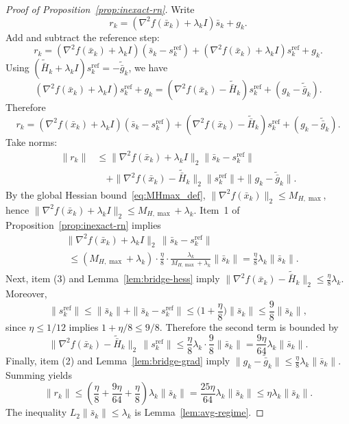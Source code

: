 \documentclass[review,onefignum,onetabnum]{siamart171218}
\begin{document}
	\begin{proof}[Proof of Proposition~\ref{prop:inexact-rn}]
		Write
		\[
		r_k=(\nabla^2 f(\bar x_k)+\lambda_k I)\bar s_k+g_k.
		\]
		Add and subtract the reference step:
		\[
		r_k=(\nabla^2 f(\bar x_k)+\lambda_k I)(\bar s_k-s_k^{\mathrm{ref}})
		+(\nabla^2 f(\bar x_k)+\lambda_k I)s_k^{\mathrm{ref}}+g_k.
		\]
		Using $(\tilde{\bar H}_k+\lambda_k I)s_k^{\mathrm{ref}}=-\tilde{\bar g}_k$, we have
		\[
		(\nabla^2 f(\bar x_k)+\lambda_k I)s_k^{\mathrm{ref}}+g_k
		=(\nabla^2 f(\bar x_k)-\tilde{\bar H}_k)s_k^{\mathrm{ref}}+(g_k-\tilde{\bar g}_k).
		\]
		Therefore
		\[
		r_k=(\nabla^2 f(\bar x_k)+\lambda_k I)(\bar s_k-s_k^{\mathrm{ref}})
		+(\nabla^2 f(\bar x_k)-\tilde{\bar H}_k)s_k^{\mathrm{ref}}+(g_k-\tilde{\bar g}_k).
		\]
		Take norms:
		\begin{align*}
			\|r_k\|
			&\le \|\nabla^2 f(\bar x_k)\!+\!\lambda_k I\|_2\|\bar s_k\!-\!s_k^{\mathrm{ref}}\|\\
			&\quad+\|\nabla^2 f(\bar x_k)\!-\!\tilde{\bar H}_k\|_2\|s_k^{\mathrm{ref}}\|
			+\|g_k\!-\!\tilde{\bar g}_k\|.
		\end{align*}
		By the global Hessian bound~\eqref{eq:MHmax_def},
		$\|\nabla^2 f(\bar x_k)\|_2\le M_{H,\max}$, hence
		$\|\nabla^2 f(\bar x_k)+\lambda_k I\|_2\le M_{H,\max}+\lambda_k$.
		Item~1 of Proposition~\ref{prop:inexact-rn} implies
		\begin{align*}
			&\|\nabla^2 f(\bar x_k)\!+\!\lambda_k I\|_2\,\|\bar s_k\!-\!s_k^{\mathrm{ref}}\|\\
			&\;\le (M_{H,\max}\!+\!\lambda_k)\!\cdot\!\tfrac{\eta}{8}\!\cdot\!\tfrac{\lambda_k}{M_{H,\max}+\lambda_k}\|\bar s_k\|
			=\tfrac{\eta}{8}\lambda_k\|\bar s_k\|.
		\end{align*}
		Next, item (3) and Lemma~\ref{lem:bridge-hess} imply
		$\|\nabla^2 f(\bar x_k)-\tilde{\bar H}_k\|_2\le \frac{\eta}{8}\lambda_k$.
		Moreover,
		\[
		\|s_k^{\mathrm{ref}}\|\le \|\bar s_k\|+\|\bar s_k-s_k^{\mathrm{ref}}\|
		\le \Big(1+\frac{\eta}{8}\Big)\|\bar s_k\|\le \frac98\|\bar s_k\|,
		\]
		since $\eta\le 1/12$ implies $1+\eta/8\le 9/8$.
		Therefore the second term is bounded by
		\[
		\|\nabla^2 f(\bar x_k)-\tilde{\bar H}_k\|_2\,\|s_k^{\mathrm{ref}}\|
		\le \frac{\eta}{8}\lambda_k\cdot \frac98\|\bar s_k\|=\frac{9\eta}{64}\lambda_k\|\bar s_k\|.
		\]
		Finally, item (2) and Lemma~\ref{lem:bridge-grad} imply $\|g_k-\tilde{\bar g}_k\|\le \frac{\eta}{8}\lambda_k\|\bar s_k\|$.
		Summing yields
		\[
		\|r_k\|\le \left(\frac{\eta}{8}+\frac{9\eta}{64}+\frac{\eta}{8}\right)\lambda_k\|\bar s_k\|
		=\frac{25\eta}{64}\lambda_k\|\bar s_k\|\le \eta\lambda_k\|\bar s_k\|.
		\]
		The inequality $L_2\|\bar s_k\|\le \lambda_k$ is Lemma~\ref{lem:avg-regime}.
	\end{proof}
	
\end{document}

